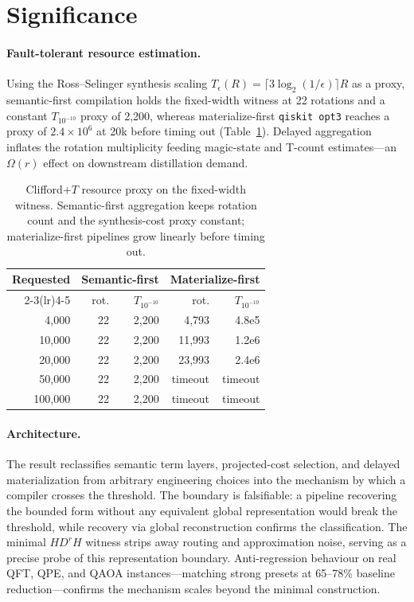 \documentclass[a4paper]{article}
\begin{document}
\section{Significance}

\paragraph{Fault-tolerant resource estimation.}
Using the Ross--Selinger synthesis scaling $T_\epsilon(R)=\lceil 3\log_2(1/\epsilon)\rceil R$ as a
proxy, semantic-first compilation holds the fixed-width witness at 22 rotations and a constant
$T_{10^{-10}}$ proxy of 2{,}200, whereas materialize-first \texttt{qiskit opt3} reaches a proxy of
$2.4\!\times\!10^{6}$ at 20k before timing out (Table~\ref{tab:resource}). Delayed aggregation
inflates the rotation multiplicity feeding magic-state and T-count estimates---an $\Omega(r)$ effect
on downstream distillation demand.

\begin{table}[t]
\centering
\small
\caption{Clifford$+T$ resource proxy on the fixed-width witness. Semantic-first aggregation keeps
rotation count and the synthesis-cost proxy constant; materialize-first pipelines grow linearly
before timing out.}
\begin{tabular}{rrrrr}
\toprule
Requested & \multicolumn{2}{c}{Semantic-first} & \multicolumn{2}{c}{Materialize-first} \\
\cmidrule(lr){2-3}\cmidrule(lr){4-5}
 & rot. & $T_{10^{-10}}$ & rot. & $T_{10^{-10}}$ \\
\midrule
4{,}000   & 22 & 2{,}200 & 4{,}793  & 4.8e5 \\
10{,}000  & 22 & 2{,}200 & 11{,}993 & 1.2e6 \\
20{,}000  & 22 & 2{,}200 & 23{,}993 & 2.4e6 \\
50{,}000  & 22 & 2{,}200 & timeout  & timeout \\
100{,}000 & 22 & 2{,}200 & timeout  & timeout \\
\bottomrule
\end{tabular}
\label{tab:resource}
\end{table}

\paragraph{Architecture.}
The result reclassifies semantic term layers, projected-cost selection, and delayed materialization
from arbitrary engineering choices into the mechanism by which a compiler crosses the threshold. The
boundary is falsifiable: a pipeline recovering the bounded form without any equivalent global
representation would break the threshold, while recovery via global reconstruction confirms the
classification. The minimal $HD^rH$ witness strips away routing and approximation noise, serving as a
precise probe of this representation boundary. Anti-regression behaviour on real QFT, QPE, and QAOA
instances---matching strong presets at 65--78\% baseline reduction---confirms the mechanism scales
beyond the minimal construction.
\end{document}
